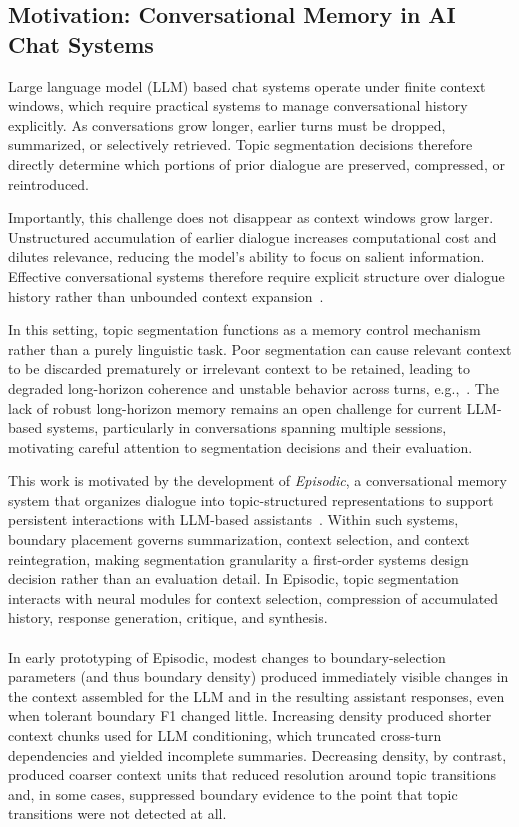 \documentclass{article}
\makeatletter
\newcommand{\myparagraph}[1]{%
  \paragraph{\@addpunct{#1}}%
}
\makeatother
\begin{document}
\subsection{Motivation: Conversational Memory in AI Chat Systems}

Large language model (LLM) based chat systems operate under finite context
windows, which require practical systems to manage conversational history
explicitly. As conversations grow longer, earlier turns must be dropped,
summarized, or selectively retrieved. Topic segmentation decisions therefore
directly determine which portions of prior dialogue are preserved, compressed,
or reintroduced.

Importantly, this challenge does not disappear as context windows grow larger.
Unstructured accumulation of earlier dialogue increases computational cost and
dilutes relevance, reducing the model's ability to focus on salient information.
Effective conversational systems therefore require explicit structure over
dialogue history rather than unbounded context expansion~\cite{liu-etal-2024-lost}.

In this setting, topic segmentation functions as a memory control
mechanism rather than a purely linguistic task. Poor segmentation can
cause relevant context to be discarded prematurely or irrelevant
context to be retained, leading to degraded long-horizon coherence and
unstable behavior across turns, e.g.,~\citep{sclar-etal-2024-quantifying,
  razavi-etal-2025-promptset}.  The lack of robust long-horizon
memory remains an open challenge for current LLM-based systems,
particularly in conversations spanning multiple sessions, motivating
careful attention to segmentation decisions and their evaluation.

This work is motivated by the development of \emph{Episodic}, a
conversational memory system that organizes dialogue into
topic-structured representations to support persistent interactions
with LLM-based assistants~\cite{episodic_github}. Within such
systems, boundary placement governs summarization, context selection,
and context reintegration, making segmentation granularity a
first-order systems design decision rather than an evaluation detail.
In Episodic, topic segmentation interacts with neural modules
for context selection, compression of accumulated history, response
generation, critique, and synthesis.

\myparagraph{Motivating observation from Episodic}
In early prototyping of Episodic, modest changes to
boundary-selection parameters (and thus boundary density) produced
immediately visible changes in the context assembled for the LLM and
in the resulting assistant responses, even when tolerant boundary F1
changed little. Increasing density produced shorter context chunks
used for LLM conditioning, which truncated cross-turn dependencies
and yielded incomplete summaries. Decreasing density, by contrast,
produced coarser context units that reduced resolution around topic
transitions and, in some cases, suppressed boundary evidence to the
point that topic transitions were not detected at all.
\end{document}
